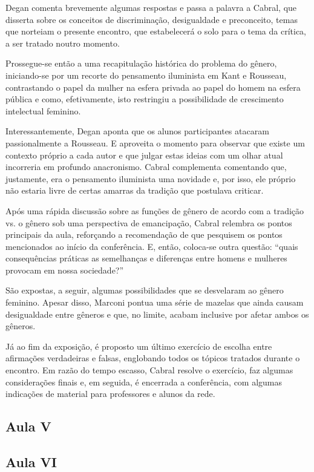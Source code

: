 \documentclass[12pt,a4paper]{article}
\begin{document}
	Degan comenta brevemente algumas respostas e passa a palavra a 
	Cabral, que disserta sobre os conceitos de discriminação, 
	desigualdade e preconceito, temas que norteiam o presente 
	encontro, que estabelecerá o solo para o tema da crítica, a 
	ser tratado noutro momento. 

	Prossegue-se então a uma recapitulação histórica do problema do 
	gênero, iniciando-se por um recorte do pensamento iluminista em 
	Kant e Rousseau, contrastando o papel da mulher na esfera 
	privada ao papel do homem na esfera pública e como, efetivamente, 
	isto restringiu a possibilidade de crescimento intelectual 
	feminino. 

	Interessantemente, Degan aponta que os alunos participantes 
	atacaram passionalmente a Rousseau. E aproveita o momento para 
	observar que existe um contexto próprio a cada autor e que 
	julgar estas ideias com um olhar atual incorreria em profundo 
	anacronismo. Cabral complementa comentando que, justamente, 
	era o pensamento iluminista uma novidade e, por isso, ele 
	próprio não estaria livre de certas amarras da tradição que 
	postulava criticar. 

	Após uma rápida discussão sobre as funções de gênero de acordo 
	com a tradição vs. o gênero sob uma perspectiva de emancipação, 
	Cabral relembra os pontos principais da aula, reforçando a 
	recomendação de que pesquisem os pontos mencionados ao início da 
	conferência. E, então, coloca-se outra questão: “quais consequências 
	práticas as semelhanças e diferenças entre homens e mulheres 
	provocam em nossa sociedade?” 

	São expostas, a seguir, algumas possibilidades que se desvelaram 
	ao gênero feminino. Apesar disso, Marconi pontua uma série de 
	mazelas que ainda causam desigualdade entre gêneros e que, no 
	limite, acabam inclusive por afetar ambos os gêneros. 

	Já ao fim da exposição, é proposto um último exercício de escolha 
	entre afirmações verdadeiras e falsas, englobando todos os tópicos 
	tratados durante o encontro. Em razão do tempo escasso, Cabral 
	resolve o exercício, faz algumas considerações finais e, em seguida, 
	é encerrada a conferência, com algumas indicações de material para 
	professores e alunos da rede. 

	\subsection{Aula V}

	\subsection{Aula VI}
	
\end{document}
